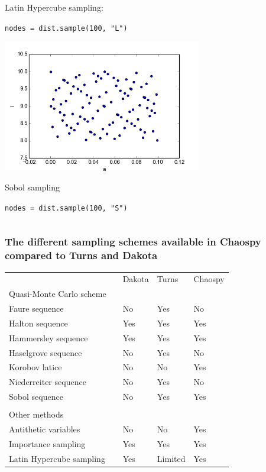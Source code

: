\documentclass[presentation]{beamer}
\begin{document}
\begin{frame}[fragile]
\begin{columns}
\begin{center}
                Latin Hypercube sampling:

                \scriptsize
                \verb;nodes = dist.sample(100, "L");
                \normalsize



                \includegraphics[width=0.65\textwidth]{samples_S.png}

                Sobol sampling

                \scriptsize
                \verb;nodes = dist.sample(100, "S");
                \normalsize
     \end{center}
 \end{columns}
\end{frame}



\begin{frame}
  \frametitle{The different sampling schemes available in Chaospy compared to Turns and Dakota}
\begin{center}
\def\arraystretch{1.1}

  \begin{tabular}{ll|lll}
        && Dakota &	Turns &	Chaospy\\
  Quasi-Monte Carlo scheme && & & \\\hline
  Faure sequence &&	No &	Yes &	No\\
  Halton sequence &&	Yes& 	Yes	& Yes\\
  Hammersley sequence &&	Yes &	Yes &	Yes\\
  Haselgrove sequence &&	No &	Yes	& No\\
  Korobov latice &&	No &	No&	Yes\\
  Niederreiter sequence &&	No&	Yes&	No\\
  Sobol sequence &&	No &	Yes &	Yes\\\\

  Other methods &&&&\\\hline
  Antithetic variables &&	No&	No&	Yes\\
  Importance sampling &&	Yes	&Yes&	Yes\\
  Latin Hypercube sampling &&	Yes &	Limited &	Yes\\
\end{tabular}
\end{center}
\end{frame}
\end{document}
